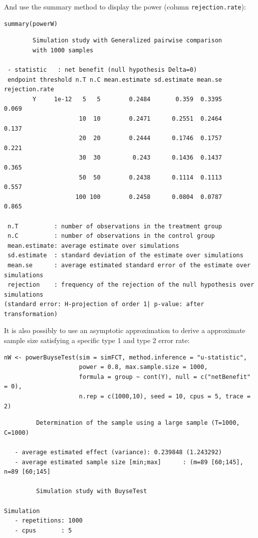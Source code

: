 \documentclass[12pt]{article}
\begin{document}
\clearpage

And use the summary method to display the power (column
\texttt{rejection.rate}):
\lstset{language=r,label= ,caption= ,captionpos=b,numbers=none}
\begin{lstlisting}
summary(powerW)
\end{lstlisting}

\begin{verbatim}
        Simulation study with Generalized pairwise comparison
        with 1000 samples

 - statistic   : net benefit (null hypothesis Delta=0)
 endpoint threshold n.T n.C mean.estimate sd.estimate mean.se rejection.rate
        Y     1e-12   5   5        0.2484       0.359  0.3395          0.069
                     10  10        0.2471      0.2551  0.2464          0.137
                     20  20        0.2444      0.1746  0.1757          0.221
                     30  30         0.243      0.1436  0.1437          0.365
                     50  50        0.2438      0.1114  0.1113          0.557
                    100 100        0.2458      0.0804  0.0787          0.865

 n.T          : number of observations in the treatment group
 n.C          : number of observations in the control group
 mean.estimate: average estimate over simulations
 sd.estimate  : standard deviation of the estimate over simulations
 mean.se      : average estimated standard error of the estimate over simulations
 rejection    : frequency of the rejection of the null hypothesis over simulations
(standard error: H-projection of order 1| p-value: after transformation)
\end{verbatim}

It is also possibly to use an asymptotic approximation to derive a
approximate sample size satisfying a specific type 1 and type 2 error
rate:
\lstset{language=r,label= ,caption= ,captionpos=b,numbers=none}
\begin{lstlisting}
nW <- powerBuyseTest(sim = simFCT, method.inference = "u-statistic", 
                     power = 0.8, max.sample.size = 1000,                     
                     formula = group ~ cont(Y), null = c("netBenefit" = 0),
                     n.rep = c(1000,10), seed = 10, cpus = 5, trace = 2)
\end{lstlisting}

\begin{verbatim}
         Determination of the sample using a large sample (T=1000, C=1000)  

   - average estimated effect (variance): 0.239848 (1.243292)
   - average estimated sample size [min;max]      : (m=89 [60;145], n=89 [60;145]

         Simulation study with BuyseTest 

Simulation
   - repetitions: 1000
   - cpus       : 5

\end{verbatim}
\end{document}
